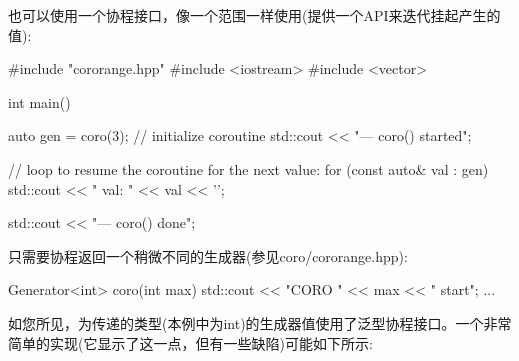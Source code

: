 也可以使用一个协程接口，像一个范围一样使用(提供一个API来迭代挂起产生的值):


\begin{cpp}
#include "cororange.hpp"
#include <iostream>
#include <vector>

int main()
{
	auto gen = coro(3); // initialize coroutine
	std::cout << "--- coro() started\n";
	
	// loop to resume the coroutine for the next value:
	for (const auto& val : gen) {
		std::cout << " val: " << val << '\n';
	}
	
	std::cout << "--- coro() done\n";
}
\end{cpp}

只需要协程返回一个稍微不同的生成器(参见coro/cororange.hpp):

\begin{cpp}
Generator<int> coro(int max)
{
	std::cout << "CORO " << max << " start\n";
	...
}
\end{cpp}

如您所见，为传递的类型(本例中为int)的生成器值使用了泛型协程接口。一个非常简单的实现(它显示了这一点，但有一些缺陷)可能如下所示:


